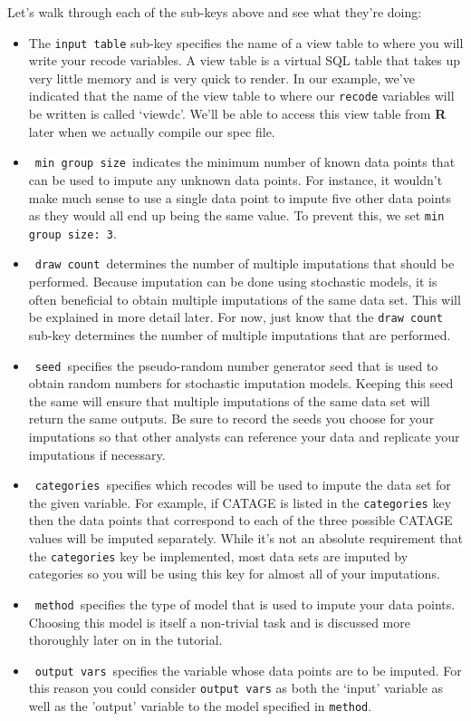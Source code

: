 \documentclass{article}
\begin{document}
Let's walk through each of the sub-keys above and see what they're doing:
\begin{itemize}
\item The {\tt input table} sub-key specifies the name of a view table to 
where you will write your recode variables. A view table is a virtual SQL table 
that takes up very little memory and is very quick to render. In our example, we've indicated 
that the name of the view table to where our {\tt recode} variables will be written is 
called `viewdc'. We'll be able to access this view table from \textbf{R} later when we actually 
compile our spec file.\\
\item \ {\tt min group size}\ indicates the minimum number of known data points that can be 
used to impute any unknown data points. For instance, it wouldn't make much sense to use a single 
data point to impute five other data points as they would all end up being the same value. To 
prevent this, we set {\tt min group size: 3}.\\
\item \ {\tt draw count}\ determines the number of multiple imputations that should be performed. 
Because imputation can be done using stochastic models, it is often beneficial to obtain multiple 
imputations of the same data set. This will be explained in more detail later. For now, just know 
that the {\tt draw count} sub-key determines the number of multiple imputations that are performed.\\
\item \ {\tt seed}\ specifies the pseudo-random number generator seed that is used to obtain 
random numbers for stochastic imputation models. Keeping this seed the same will ensure that multiple imputations of the same data set will return the same outputs. Be sure to record the seeds you choose for your 
imputations so that other analysts can reference your data and replicate your imputations if necessary.\\
\item \ {\tt categories}\  specifies which recodes will be used to impute the data set for 
the given variable. For example, if CATAGE is listed in the {\tt categories} key then the 
data points that correspond to each of the three possible CATAGE values will be imputed 
separately. While it's not an absolute requirement that the {\tt categories} key be implemented, most data 
sets are imputed by categories so you will be using this key for almost all of your imputations.\\
\item \ {\tt method}\ specifies the type of model that is used to impute your data points. 
Choosing this model is itself a non-trivial task and is discussed more thoroughly later on 
in the tutorial.\\
\item \ {\tt output vars}\ specifies the variable whose data points are to be imputed. For this reason 
you could consider {\tt output vars} as both the `input' variable as well as the 'output' variable 
to the model specified in {\tt method}.\\
\end{itemize}
\end{document}
